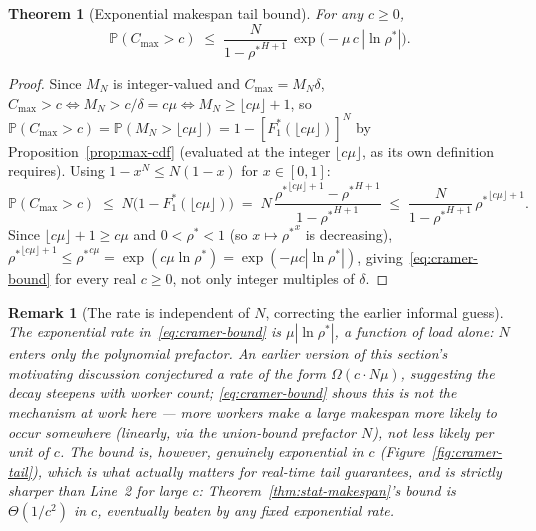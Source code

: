 \documentclass[11pt,a4paper]{report}
\newtheorem{theorem}{Theorem}[section]
\newtheorem{remark}{Remark}[section]
\newcommand{\abs}[1]{\left\lvert #1 \right\rvert}
\newcommand{\rhostar}{\rho^{*}}
\newcommand{\Cmax}{C_{\max}}
\begin{document}
\begin{theorem}[Exponential makespan tail bound]
\label{thm:cramer-makespan}
For any $c \geq 0$,
\begin{equation}
  \mathbb{P}(\Cmax > c)
  \;\leq\;
  \frac{N}{1-{\rhostar}^{H+1}}\,
  \exp\bigl(-\mu\, c\, \abs{\ln\rhostar}\bigr).
  \label{eq:cramer-bound}
\end{equation}
\end{theorem}

\begin{proof}
Since $M_N$ is integer-valued and $\Cmax = M_N\delta$, $\Cmax > c
\iff M_N > c/\delta = c\mu \iff M_N \geq \lfloor c\mu\rfloor + 1$, so
$\mathbb{P}(\Cmax > c) = \mathbb{P}(M_N > \lfloor c\mu \rfloor) =
1 - [F_1^*(\lfloor c\mu\rfloor)]^N$ by Proposition~\ref{prop:max-cdf}
(evaluated at the integer $\lfloor c\mu \rfloor$, as its own definition
requires). Using $1-x^N \leq N(1-x)$ for $x \in [0,1]$:
\[
  \mathbb{P}(\Cmax > c)
  \;\leq\;
  N\bigl(1-F_1^*(\lfloor c\mu\rfloor)\bigr)
  \;=\;
  N\,\frac{{\rhostar}^{\lfloor c\mu\rfloor+1} - {\rhostar}^{H+1}}{1-{\rhostar}^{H+1}}
  \;\leq\;
  \frac{N}{1-{\rhostar}^{H+1}}\,{\rhostar}^{\lfloor c\mu\rfloor+1}.
\]
Since $\lfloor c\mu\rfloor + 1 \geq c\mu$ and $0<\rhostar<1$ (so
$x\mapsto{\rhostar}^x$ is decreasing), ${\rhostar}^{\lfloor
c\mu\rfloor+1} \leq {\rhostar}^{c\mu} = \exp(c\mu\ln\rhostar) =
\exp(-\mu c\abs{\ln\rhostar})$, giving~\eqref{eq:cramer-bound} for
every real $c \geq 0$, not only integer multiples of $\delta$.
\end{proof}

\begin{remark}[The rate is independent of $N$, correcting the earlier
informal guess]
The exponential \emph{rate} in~\eqref{eq:cramer-bound} is
$\mu\abs{\ln\rhostar}$, a function of load alone: $N$ enters only the
polynomial prefactor. An earlier version of this section's motivating
discussion conjectured a rate of the form $\Omega(c \cdot N\mu)$,
suggesting the decay steepens with worker count; \eqref{eq:cramer-bound}
shows this is not the mechanism at work here --- more workers make a
large makespan \emph{more} likely to occur somewhere (linearly, via
the union-bound prefactor $N$), not less likely per unit of $c$. The
bound is, however, genuinely exponential in $c$ (Figure~\ref{fig:cramer-tail}),
which is what actually matters for real-time tail guarantees, and is
strictly sharper than Line~2 for large $c$: Theorem~\ref{thm:stat-makespan}'s
bound is $\Theta(1/c^2)$ in $c$, eventually beaten by any fixed
exponential rate.
\end{remark}
\end{document}
